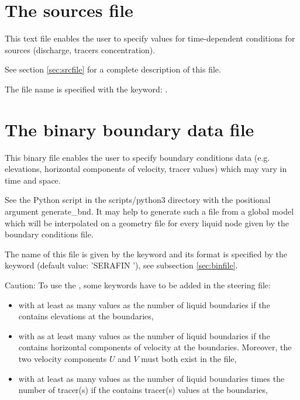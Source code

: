 \section{The sources file}

This text file enables the user to specify values for time-dependent conditions
for sources (discharge, tracers concentration).

See section \ref{sec:srcfile} for a complete description of this file.

The file name is specified with the keyword: .


\section{The binary boundary data file}

This binary file enables the user to specify boundary conditions data (e.g.
elevations, horizontal components of velocity, tracer values) which
may vary in time and space.

See the Python script  in the scripts/python3 directory
with the positional argument generate\_bnd.
It may help to generate such a file from a global model which will be
interpolated on a geometry file for every liquid node given by the boundary
conditions file.

The name of this file is given by the keyword 
and its format is specified by the keyword
 (default value: 'SERAFIN '),
see subsection \ref{sec:binfile}.

\begin{WarningBlock}{Caution:}
To use the , some keywords have to be added
in the steering file:
\begin{itemize}
\item {} with at least as many values as the
number of liquid boundaries if the  contains
elevations at the boundaries,
\item {} with as at least many values as the
number of liquid boundaries if the  contains
horizontal components of velocity at the boundaries.
Moreover, the two velocity components $U$ and $V$ must both exist in the file,
\item {} with at least as many values as the
number of liquid boundaries times the number of tracer(s) if the
 contains tracer(s) values at the boundaries,
\end{itemize}
\end{WarningBlock}


